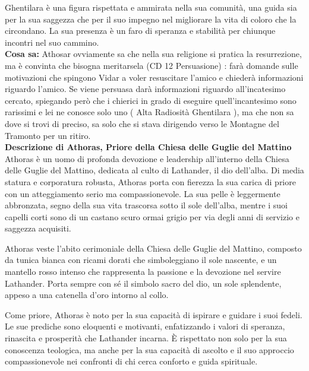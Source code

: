 \documentclass{article}
\begin{document}
            Ghentilara è una figura rispettata e ammirata nella sua comunità, una guida sia per la sua saggezza che per il suo impegno nel migliorare la vita di coloro che la circondano. La sua presenza è un faro di speranza e stabilità per chiunque incontri nel suo cammino.\\

                  \textbf{Cosa sa:} Athosar ovviamente sa che nella sua religione si pratica la resurrezione, ma è convinta che bisogna meritarsela (CD 12 Persuasione) : farà domande sulle motivazioni che spingono Vidar a voler resuscitare l'amico e chiederà informazioni riguardo l'amico. Se viene persuasa darà informazioni riguardo all'incatesimo cercato, spiegando però che i chierici in grado di eseguire quell'incantesimo sono rarissimi e lei ne conosce solo uno ( Alta Radiosità Ghentilara ), ma che non sa dove si trovi di preciso, sa solo che si stava dirigendo verso le Montagne del Tramonto per un ritiro. 
                    \\
                  \textbf{Descrizione di Athoras, Priore della Chiesa delle Guglie del Mattino}
                  Athoras è un uomo di profonda devozione e leadership all'interno della Chiesa delle Guglie del Mattino, dedicata al culto di Lathander, il dio dell'alba. Di media statura e corporatura robusta, Athoras porta con fierezza la sua carica di priore con un atteggiamento serio ma compassionevole. La sua pelle è leggermente abbronzata, segno della sua vita trascorsa sotto il sole dell'alba, mentre i suoi capelli corti sono di un castano scuro ormai grigio per via degli anni di servizio e saggezza acquisiti.
                  
                  Athoras veste l'abito cerimoniale della Chiesa delle Guglie del Mattino, composto da tunica bianca con ricami dorati che simboleggiano il sole nascente, e un mantello rosso intenso che rappresenta la passione e la devozione nel servire Lathander. Porta sempre con sé il simbolo sacro del dio, un sole splendente, appeso a una catenella d'oro intorno al collo.
                  
                  Come priore, Athoras è noto per la sua capacità di ispirare e guidare i suoi fedeli. Le sue prediche sono eloquenti e motivanti, enfatizzando i valori di speranza, rinascita e prosperità che Lathander incarna. È rispettato non solo per la sua conoscenza teologica, ma anche per la sua capacità di ascolto e il suo approccio compassionevole nei confronti di chi cerca conforto e guida spirituale.
                  
\end{document}
